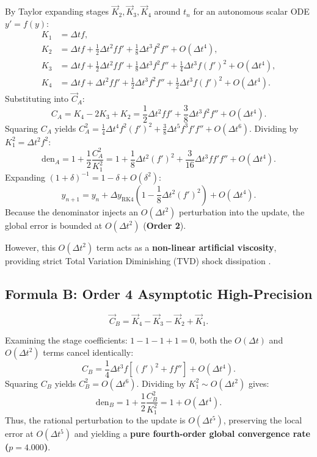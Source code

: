 \documentclass[11pt,a4paper]{article}
\theoremstyle{definition}
\begin{document}
By Taylor expanding stages $\vec{K}_2, \vec{K}_3, \vec{K}_4$ around $t_n$ for an autonomous scalar ODE $y' = f(y)$:
\begin{align}
    K_1 &= \Delta t f, \nonumber \\
    K_2 &= \Delta t f + \tfrac{1}{2}\Delta t^2 f f' + \tfrac{1}{8}\Delta t^3 f^2 f'' + O(\Delta t^4), \nonumber \\
    K_3 &= \Delta t f + \tfrac{1}{2}\Delta t^2 f f' + \tfrac{1}{8}\Delta t^3 f^2 f'' + \tfrac{1}{4}\Delta t^3 f (f')^2 + O(\Delta t^4), \nonumber \\
    K_4 &= \Delta t f + \Delta t^2 f f' + \tfrac{1}{2}\Delta t^3 f^2 f'' + \tfrac{1}{2}\Delta t^3 f (f')^2 + O(\Delta t^4).
\end{align}
Substituting into $\vec{C}_A$:
\begin{equation}
    C_A = K_4 - 2K_3 + K_2 = \frac{1}{2}\Delta t^2 f f' + \frac{3}{8}\Delta t^3 f^2 f'' + O(\Delta t^4).
\end{equation}
Squaring $C_A$ yields $C_A^2 = \frac{1}{4}\Delta t^4 f^2 (f')^2 + \frac{3}{8}\Delta t^5 f^3 f' f'' + O(\Delta t^6)$. Dividing by $K_1^2 = \Delta t^2 f^2$:
\begin{equation}
    \text{den}_A = 1 + \frac{1}{2}\frac{C_A^2}{K_1^2} = 1 + \frac{1}{8}\Delta t^2 (f')^2 + \frac{3}{16}\Delta t^3 f f' f'' + O(\Delta t^4).
\end{equation}
Expanding $(1 + \delta)^{-1} = 1 - \delta + O(\delta^2)$:
\begin{equation}
    y_{n+1} = y_n + \Delta y_{\text{RK4}} \left(1 - \frac{1}{8}\Delta t^2 (f')^2\right) + O(\Delta t^4).
\end{equation}
Because the denominator injects an $O(\Delta t^2)$ perturbation into the update, the global error is bounded at $O(\Delta t^2)$ (\textbf{Order 2}). 

However, this $O(\Delta t^2)$ term acts as a \textbf{non-linear artificial viscosity}, providing strict Total Variation Diminishing (TVD) shock dissipation \cite{shu1988efficient}.

\subsection{Formula B: Order 4 Asymptotic High-Precision}
\begin{equation}
    \vec{C}_B = \vec{K}_4 - \vec{K}_3 - \vec{K}_2 + \vec{K}_1.
    \label{eq:form_b}
\end{equation}

Examining the stage coefficients: $1 - 1 - 1 + 1 = 0$, both the $O(\Delta t)$ and $O(\Delta t^2)$ terms cancel identically:
\begin{equation}
    C_B = \frac{1}{4}\Delta t^3 f \left[(f')^2 + f f''\right] + O(\Delta t^4).
\end{equation}
Squaring $C_B$ yields $C_B^2 = O(\Delta t^6)$. Dividing by $K_1^2 \sim O(\Delta t^2)$ gives:
\begin{equation}
    \text{den}_B = 1 + \frac{1}{2}\frac{C_B^2}{K_1^2} = 1 + O(\Delta t^4).
\end{equation}
Thus, the rational perturbation to the update is $O(\Delta t^5)$, preserving the local error at $O(\Delta t^5)$ and yielding a \textbf{pure fourth-order global convergence rate ($p = 4.000$)}.
\end{document}
